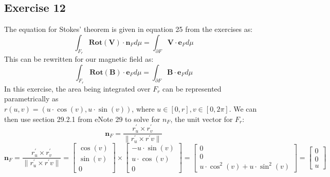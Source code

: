 \documentclass{article}
\begin{document}
\subsection{Exercise 12}   
The equation for Stokes' theorem is given in equation 25 from the exercises as:
\begin{equation}
    \int_{F_{r}}^{}\mathit{\mathbf{Rot}}\left(\mathbf{V}\right)\cdot \mathbf{n}_{F}d\mu=\int_{\partial F}^{}\mathbf{V}\cdot \mathbf{e}_{F}d\mu
\end{equation}
This can be rewritten for our magnetic field as:
\begin{equation}
    \int_{F_{r}}^{}\mathit{\mathbf{Rot}}\left(\mathbf{B}\right)\cdot \mathbf{e}_{F}d\mu=\int_{\partial F}^{}\mathbf{B}\cdot \mathbf{e}_{F}d\mu
\end{equation}
In this exercise, the area being integrated over $F_r$ can be represented parametrically as
\\
$r\left(u,v\right)=\left(u\cdot \cos\left(v\right),u\cdot \sin\left(v\right)\right)$, where $u\in\left[0,r\right],v\in\left[0,2\pi\right]$.
We can then use section 29.2.1 from eNote 29 to solve for $n_F$, the unit vector for $F_r$:
\begin{equation}
    \mathbf{n}_{F}=\frac{r^\prime_{u}\times r^\prime_{v}}{{\|r^\prime_{u}\times r^\prime{v}\|}}
\end{equation}
\begin{equation}
\mathbf{n}_{F}=\frac{r^\prime_{u}\times r^\prime_{v}}{{\|r^\prime_{u}\times r^\prime{v}\|}} = \left[\begin{array}{c}
\cos\left(v\right) 
\\
 \sin\left(v\right) 
\\
 0 
\end{array}\right]\times\left[\begin{array}{c}
-u\cdot\sin\left(v\right) 
\\
 u\cdot\cos\left(v\right) 
\\
 0 
\end{array}\right]=\left[\begin{array}{c}
0 
\\
 0 
\\
 u\cdot\cos^{2}\left(v\right)+u\cdot\sin^{2}\left(v\right) 
\end{array}\right]=\left[\begin{array}{c}
0 
\\
 0 
\\
 u 
\end{array}\right]
\end{equation}
\end{document}
